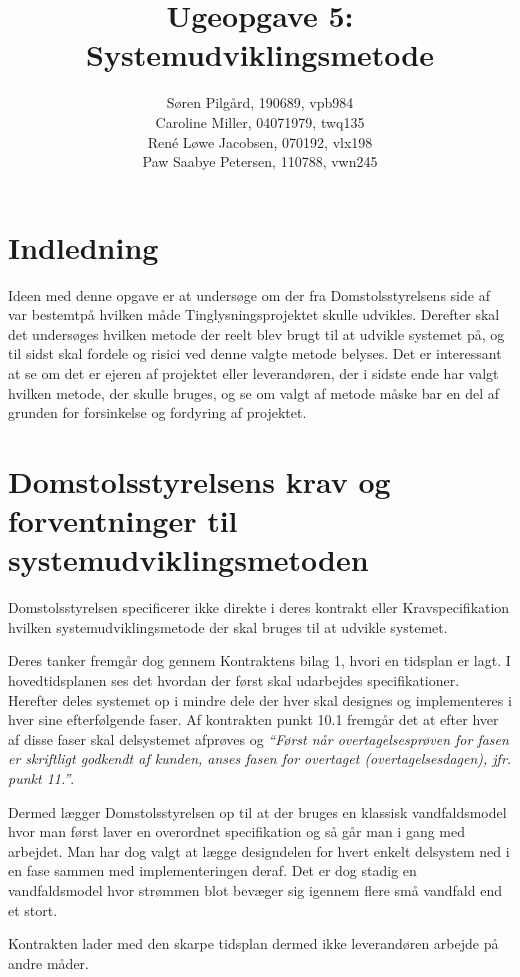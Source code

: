 \documentclass[10pt,a4paper,danish]{article}
\title{Ugeopgave 5: Systemudviklingsmetode}
\author{Søren Pilgård, 190689, vpb984\\
Caroline Miller, 04071979, twq135\\
René Løwe Jacobsen, 070192, vlx198\\
Paw Saabye Petersen, 110788, vwn245}
\begin{document}
\maketitle
\newpage


\section{Indledning}
Ideen med denne opgave er at undersøge om der fra Domstolsstyrelsens side af var bestemtpå hvilken måde Tinglysningsprojektet skulle udvikles. Derefter skal det undersøges hvilken metode der reelt blev brugt til at udvikle systemet på, og til sidst skal fordele og risici ved denne valgte metode belyses. Det er interessant at se om det er ejeren af projektet eller leverandøren, der i sidste ende har valgt hvilken metode, der skulle bruges, og se om valgt af metode måske bar en del af grunden for forsinkelse og fordyring af projektet.


\section{Domstolsstyrelsens krav og forventninger til systemudviklingsmetoden}
Domstolsstyrelsen specificerer ikke direkte i deres kontrakt\cite{Kontrakt}
eller Kravspecifikation\cite{Krav} hvilken systemudviklingsmetode der skal
bruges til at udvikle systemet.

Deres tanker fremgår dog gennem Kontraktens bilag 1\cite{Tid}, hvori en tidsplan
er lagt.
I hovedtidsplanen ses det hvordan der først skal udarbejdes specifikationer.
Herefter deles systemet op i mindre dele der hver skal designes og implementeres
i hver sine efterfølgende faser. Af kontrakten punkt 10.1
fremgår det at efter hver af disse faser skal delsystemet afprøves og 
\textit{``Først når overtagelsesprøven for fasen er skriftligt godkendt af kunden, 
anses fasen for overtaget (overtagelsesdagen), jfr. punkt 11.''}\cite[s.~16]{Kontrakt}.

Dermed lægger Domstolsstyrelsen op til at der bruges en klassisk vandfaldsmodel
hvor man først laver en overordnet specifikation og så går man i gang med
arbejdet. Man har dog valgt at lægge designdelen for hvert enkelt delsystem ned
i en fase sammen med implementeringen deraf. Det er dog stadig en vandfaldsmodel
hvor strømmen blot bevæger sig igennem flere små vandfald end et stort.

Kontrakten lader med den skarpe tidsplan dermed ikke leverandøren arbejde på
andre måder.
\end{document}
